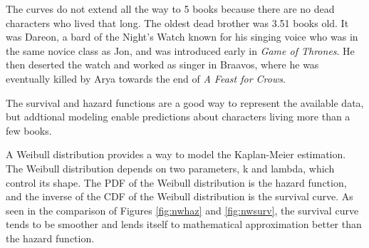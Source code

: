 \documentclass{article}
\begin{document}
The curves do not extend all the way to 5 books because there are no dead characters who lived that long. The oldest dead brother was 3.51 books old.  It was Dareon, a bard of the Night's Watch known for his singing voice who was in the same novice class as Jon, and was introduced early in \textit{Game of Thrones}.  He then deserted the watch and worked as singer in Braavos, where he was eventually killed by Arya towards the end of \textit{A Feast for Crows}.

The survival and hazard functions are a good way to represent the available data, but addtional modeling enable predictions about characters living more than a few books.

A Weibull distribution provides a way to model the Kaplan-Meier estimation.  The Weibull distribution depends on two parameters, k and lambda, which control its shape.  The PDF of the Weibull distribution is the hazard function, and the inverse of the CDF of the Weibull distribution is the survival curve.  As seen in the comparison of Figures \ref{fig:nwhaz} and \ref{fig:nwsurv}, the survival curve tends to be smoother and lends itself to mathematical approximation better than the hazard function. 
\end{document}
